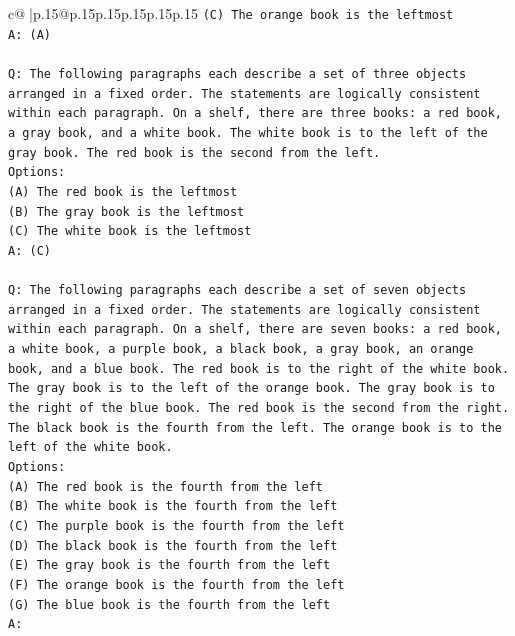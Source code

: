 \documentclass{article}
\begin{document}
{\begin{supertabular}{c@{$\;$}|p{.15\linewidth}@{}p{.15\linewidth}p{.15\linewidth}p{.15\linewidth}p{.15\linewidth}p{.15\linewidth}}
{{{\texttt{(C) The orange book is the leftmost} \\
\texttt{A: (A)} \\
\\ 
\texttt{Q: The following paragraphs each describe a set of three objects arranged in a fixed order. The statements are logically consistent within each paragraph. On a shelf, there are three books: a red book, a gray book, and a white book. The white book is to the left of the gray book. The red book is the second from the left.} \\
\texttt{Options:} \\
\texttt{(A) The red book is the leftmost} \\
\texttt{(B) The gray book is the leftmost} \\
\texttt{(C) The white book is the leftmost} \\
\texttt{A: (C)} \\
\\ 
\texttt{Q: The following paragraphs each describe a set of seven objects arranged in a fixed order. The statements are logically consistent within each paragraph. On a shelf, there are seven books: a red book, a white book, a purple book, a black book, a gray book, an orange book, and a blue book. The red book is to the right of the white book. The gray book is to the left of the orange book. The gray book is to the right of the blue book. The red book is the second from the right. The black book is the fourth from the left. The orange book is to the left of the white book.} \\
\texttt{Options:} \\
\texttt{(A) The red book is the fourth from the left} \\
\texttt{(B) The white book is the fourth from the left} \\
\texttt{(C) The purple book is the fourth from the left} \\
\texttt{(D) The black book is the fourth from the left} \\
\texttt{(E) The gray book is the fourth from the left} \\
\texttt{(F) The orange book is the fourth from the left} \\
\texttt{(G) The blue book is the fourth from the left} \\
\texttt{A:} \\
            }
        }
    }
     \\ \\


\end{supertabular}}
\end{document}
